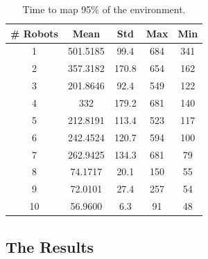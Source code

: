 \begin{table}
\centering
\caption{Time to map 95\% of the environment.}
\label{table:timing}
\begin{tabular}{c|c|c|c|c}
\hline
\hline
\# Robots & Mean & Std  & Max & Min \\
\hline
1 &  501.5185  &  99.4  & 684  & 341\\
\hline
2 &  357.3182  & 170.8  & 654  & 162\\
\hline
3 & 201.8646   & 92.4  & 549  & 122\\
\hline
4 &  332  & 179.2 & 681  & 140\\
\hline
5 &  212.8191  & 113.4  & 523  & 117\\
\hline
6  & 242.4524  & 120.7  & 594  & 100\\
\hline
7  & 262.9425  & 134.3  & 681  &  79\\
\hline
8  &  74.1717  &  20.1 &  150  & 55\\
\hline
9  &  72.0101  &  27.4  & 257   & 54\\
\hline
10  &  56.9600  &   6.3  &  91  &  48\\
\hline
\hline
\end{tabular}
\end{table}



\subsection{The Results}
\label{S:Exp:Results}

